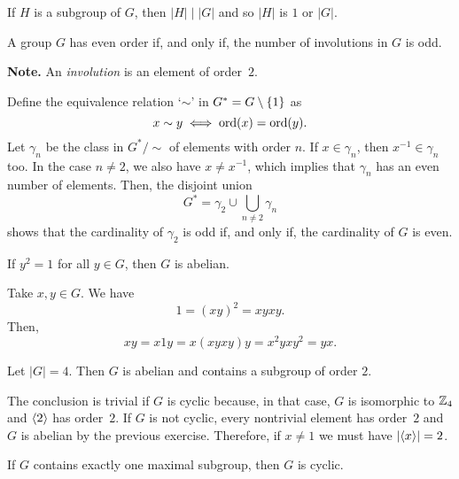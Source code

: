 \begin{solution} If $H$ is a subgroup of $G$, then $|H|\mid|G|$ and so $|H|$ is $1$ or $|G|$.  \end{solution}

\begin{exr}\label{exercise-1.1.7}
    A group\/ $G$ has even order if, and only if, the number of involutions in\/ $G$ is odd.

    \textrm{\rm\textbf{Note.} An \textsl{involution\/} is an element of order~$2$.}
\end{exr}

\begin{solution} Define the equivalence relation `$\sim$' in $G^*=G\setminus\{1\}$ as
$$
    x\sim y\iff{\rm ord}(x)={\rm ord}(y).
$$
Let $\gamma_n$ be the class in $G^*\!/{\sim}$ of elements with order $n$. If $x\in\gamma_n$, then $x^{-1}\in\gamma_n$ too. In the case $n\ne2$, we also have $x\ne x^{-1}$, which implies that $\gamma_n$ has an even number of elements. Then, the disjoint union
$$
    G^* = \gamma_2\cup\bigcup_{n\ne2}\gamma_n
$$
shows that the cardinality of $\gamma_2$ is odd if, and only if, the cardinality of $G$ is even.  \end{solution}

\begin{exr}
    If\/ $y^2=1$ for all\/ $y\in G$, then\/ $G$ is abelian.
\end{exr}

\begin{solution} Take $x,y\in G$. We have
$$
    1 = (xy)^2 = xyxy.
$$
Then,
$$
    xy = x1y = x(xyxy)y = x^2yxy^2 = yx.
$$
 \end{solution}

\begin{exr}
    Let\/ $|G|=4$. Then\/ $G$ is abelian and contains a subgroup of order\/ $2$.
\end{exr}

\begin{solution} The conclusion is trivial if $G$ is cyclic because, in that case, $G$ is isomorphic to $\mathbb{Z}_4$ and $\langle2\rangle$ has order~$2$. If $G$ is not cyclic, every nontrivial element has order~$2$ and $G$ is abelian by the previous exercise. Therefore, if $x\ne1$ we must have $|\langle x\rangle|=2$.  \end{solution}

\begin{exr}\label{exercise-1.2.10}
    If\/ $G$ contains exactly one maximal subgroup, then\/ $G$ is cyclic.
\end{exr}

